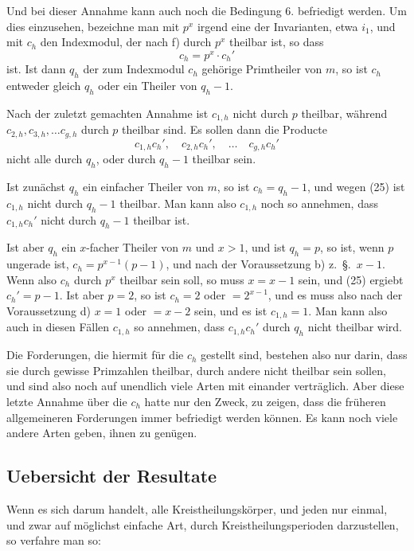 \documentclass[12pt,a4paper]{article}
\theoremstyle{plain}
\theoremstyle{definition}
\theoremstyle{remark}
\begin{document}
Und bei dieser Annahme kann auch noch die Bedingung 6. befriedigt werden. Um dies einzusehen, bezeichne man mit $p^x$ irgend eine der Invarianten, etwa $i_1$, und mit $c_h$ den Indexmodul, der nach f) durch $p^x$ theilbar ist, so dass
\begin{equation}\tag{25}
c_h = p^x \cdot c_{h}'
\end{equation}
ist. Ist dann $q_h$ der zum Indexmodul $c_h$ gehörige Primtheiler von $m$, so ist $c_h$ entweder gleich $q_h$ oder ein Theiler von $q_h-1$.

Nach der zuletzt gemachten Annahme ist $c_{1,h}$ nicht durch $p$ theilbar, während $c_{2,h}, c_{3,h}, \ldots c_{g,h}$ durch $p$ theilbar sind. Es sollen dann die Producte
\[
c_{1,h} c_{h}', \quad c_{2,h} c_{h}', \quad \ldots \quad c_{g,h} c_{h}'
\]
nicht alle durch $q_h$, oder durch $q_h-1$ theilbar sein.

Ist zunächst $q_h$ ein einfacher Theiler von $m$, so ist $c_h = q_h-1$, und wegen (25) ist $c_{1,h}$ nicht durch $q_h-1$ theilbar. Man kann also $c_{1,h}$ noch so annehmen, dass $c_{1,h} c_{h}'$ nicht durch $q_h-1$ theilbar ist.

Ist aber $q_h$ ein $x$-facher Theiler von $m$ und $x > 1$, und ist $q_h = p$, so ist, wenn $p$ ungerade ist, $c_h = p^{x-1}(p-1)$, und nach der Voraussetzung b) z.~\S.~$x-1$. Wenn also $c_h$ durch $p^x$ theilbar sein soll, so muss $x = x-1$ sein, und (25) ergiebt $c_{h}' = p-1$. Ist aber $p = 2$, so ist $c_h = 2$ oder $= 2^{x-1}$, und es muss also nach der Voraussetzung d) $x = 1$ oder $= x-2$ sein, und es ist $c_{1,h} = 1$. Man kann also auch in diesen Fällen $c_{1,h}$ so annehmen, dass $c_{1,h} c_{h}'$ durch $q_h$ nicht theilbar wird.

Die Forderungen, die hiermit für die $c_h$ gestellt sind, bestehen also nur darin, dass sie durch gewisse Primzahlen theilbar, durch andere nicht theilbar sein sollen, und sind also noch auf unendlich viele Arten mit einander verträglich. Aber diese letzte Annahme über die $c_h$ hatte nur den Zweck, zu zeigen, dass die früheren allgemeineren Forderungen immer befriedigt werden können. Es kann noch viele andere Arten geben, ihnen zu genügen.

\subsection*{Uebersicht der Resultate}

Wenn es sich darum handelt, alle Kreistheilungskörper, und jeden nur einmal, und zwar auf möglichst einfache Art, durch Kreistheilungsperioden darzustellen, so verfahre man so:
\end{document}
